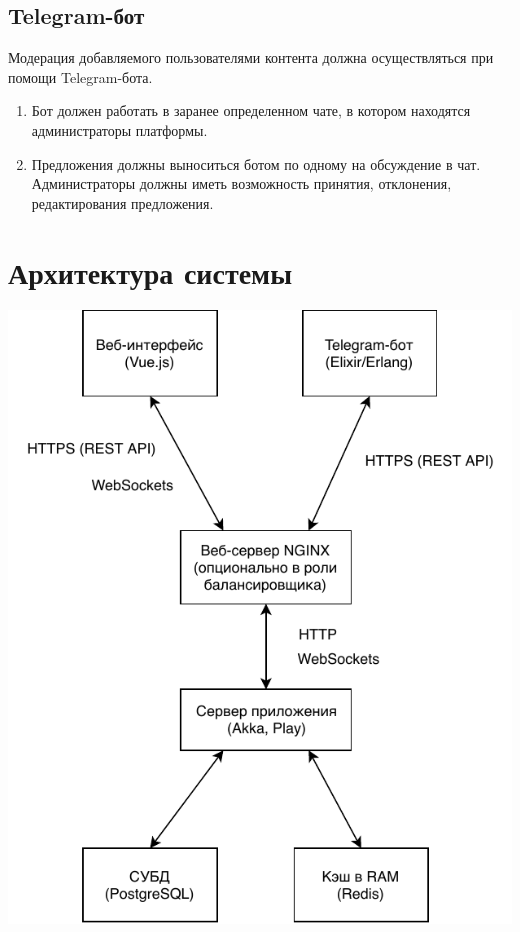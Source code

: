 \documentclass[12pt, a4paper]{article}
\begin{document}
\subsection{Telegram-бот}
\label{telegram-bot}

Модерация добавляемого пользователями контента должна осуществляться
при помощи Telegram-бота.

\begin{enumerate}
\item Бот должен работать в заранее определенном чате, в котором находятся администраторы платформы.
\item Предложения должны выноситься ботом по одному на обсуждение в чат. Администраторы должны иметь возможность принятия, отклонения, редактирования предложения. 
\end{enumerate}

\section{Архитектура системы}

\begin{center}
\includegraphics{architecture-overview.pdf}
\end{center}
\end{document}
